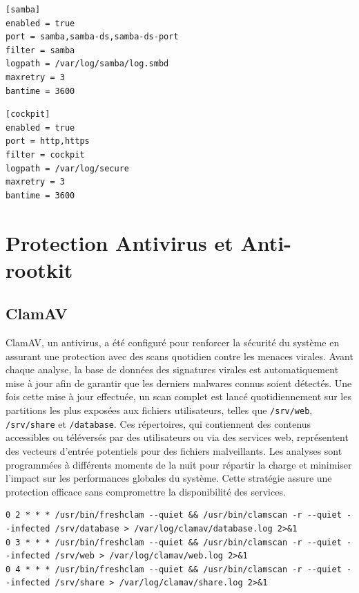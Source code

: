 \documentclass[a4paper,12pt]{article}
\begin{document}
\begin{lstlisting}[caption={Configuration Fail2Ban Samba – /etc/fail2ban/jail.d/samba.local}]
[samba]
enabled = true
port = samba,samba-ds,samba-ds-port
filter = samba
logpath = /var/log/samba/log.smbd
maxretry = 3
bantime = 3600
\end{lstlisting}

\begin{lstlisting}[caption={Configuration Fail2Ban Cockpit – /etc/fail2ban/jail.d/cockpit.local}]
[cockpit]
enabled = true
port = http,https
filter = cockpit
logpath = /var/log/secure
maxretry = 3
bantime = 3600
\end{lstlisting}

\clearpage
\section{Protection Antivirus et Anti-rootkit}

\subsection{ClamAV}

ClamAV, un antivirus, a été configuré pour renforcer la sécurité du système en assurant une protection avec des scans quotidien contre les menaces virales. Avant chaque analyse, la base de données des signatures virales est automatiquement mise à jour afin de garantir que les derniers malwares connus soient détectés. Une fois cette mise à jour effectuée, un scan complet est lancé quotidiennement sur les partitions les plus exposées aux fichiers utilisateurs, telles que  \texttt{/srv/web},  \texttt{/srv/share} et  \texttt{/database}. Ces répertoires, qui contiennent des contenus accessibles ou téléversés par des utilisateurs ou via des services web, représentent des vecteurs d'entrée potentiels pour des fichiers malveillants. Les analyses sont programmées à différents moments de la nuit pour répartir la charge et minimiser l'impact sur les performances globales du système. Cette stratégie assure une protection efficace sans compromettre la disponibilité des services.

\begin{lstlisting}[caption={Configuration ClamAV – /etc/crontab}]
0 2 * * * /usr/bin/freshclam --quiet && /usr/bin/clamscan -r --quiet --infected /srv/database > /var/log/clamav/database.log 2>&1
0 3 * * * /usr/bin/freshclam --quiet && /usr/bin/clamscan -r --quiet --infected /srv/web > /var/log/clamav/web.log 2>&1
0 4 * * * /usr/bin/freshclam --quiet && /usr/bin/clamscan -r --quiet --infected /srv/share > /var/log/clamav/share.log 2>&1
\end{lstlisting}
\end{document}
